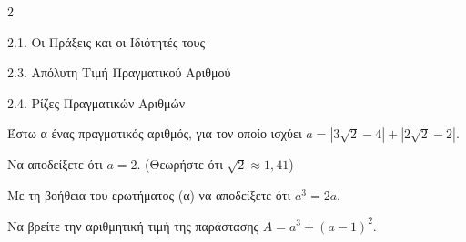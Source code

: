 \begin{ylh}{2}
    \item 2.1. Οι Πράξεις και οι Ιδιότητές τους
    \item 2.3. Απόλυτη Τιμή Πραγματικού Αριθμού
    \item 2.4. Ρίζες Πραγματικών Αριθμών
\end{ylh}
Έστω α ένας πραγματικός αριθμός, για τον οποίο ισχύει $a = |3\sqrt{2}-4| + |2\sqrt{2}-2|$.

\begin{alist}
\item Να αποδείξετε ότι $a = 2$. (Θεωρήστε ότι $\sqrt{2} \approx 1,41$) 
\item Με τη βοήθεια του ερωτήματος (α) να αποδείξετε ότι $a^3 = 2a$. 
\item Να βρείτε την αριθμητική τιμή της παράστασης $A = a^3 + (a-1)^2$. 
\end{alist}

